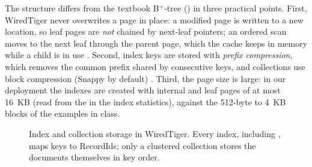 The structure differs from the textbook B$^+$-tree () in three practical points.
First, WiredTiger never overwrites a page in place: a modified page is written to a new location,
so leaf pages are \emph{not} chained by next-leaf pointers; an ordered scan moves to the next leaf
through the parent page, which the cache keeps in memory while a child is in use
\cite{wt-users-bplus}. Second, index keys are stored with \emph{prefix compression}, which removes
the common prefix shared by consecutive keys, and collections use block compression (Snappy by
default) \cite{mongodb-wiredtiger}. Third, the page size is large: in our deployment the indexes are
created with internal and leaf pages of at most 16~KB (read from the  in the
index statistics), against the 512-byte to 4~KB blocks of the examples in class.

\begin{figure}[H]
\centering
{}
\caption{Index and collection storage in WiredTiger. Every index, including , maps keys
to RecordIds; only a clustered collection stores the documents themselves in key order.}
\label{fig:idx-storage}
\end{figure}

